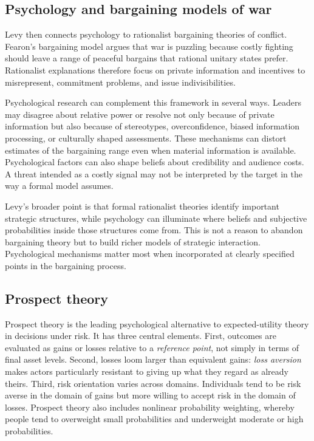 \subsection{Psychology and bargaining models of war}

Levy then connects psychology to rationalist bargaining theories of conflict. Fearon's bargaining model argues that war is puzzling because costly fighting should leave a range of peaceful bargains that rational unitary states prefer. Rationalist explanations therefore focus on private information and incentives to misrepresent, commitment problems, and issue indivisibilities.

Psychological research can complement this framework in several ways. Leaders may disagree about relative power or resolve not only because of private information but also because of stereotypes, overconfidence, biased information processing, or culturally shaped assessments. These mechanisms can distort estimates of the bargaining range even when material information is available. Psychological factors can also shape beliefs about credibility and audience costs. A threat intended as a costly signal may not be interpreted by the target in the way a formal model assumes.

Levy's broader point is that formal rationalist theories identify important strategic structures, while psychology can illuminate where beliefs and subjective probabilities inside those structures come from. This is not a reason to abandon bargaining theory but to build richer models of strategic interaction. Psychological mechanisms matter most when incorporated at clearly specified points in the bargaining process.

\subsection{Prospect theory}

Prospect theory is the leading psychological alternative to expected-utility theory in decisions under risk. It has three central elements. First, outcomes are evaluated as gains or losses relative to a \emph{reference point}, not simply in terms of final asset levels. Second, losses loom larger than equivalent gains: \emph{loss aversion} makes actors particularly resistant to giving up what they regard as already theirs. Third, risk orientation varies across domains. Individuals tend to be risk averse in the domain of gains but more willing to accept risk in the domain of losses. Prospect theory also includes nonlinear probability weighting, whereby people tend to overweight small probabilities and underweight moderate or high probabilities.

